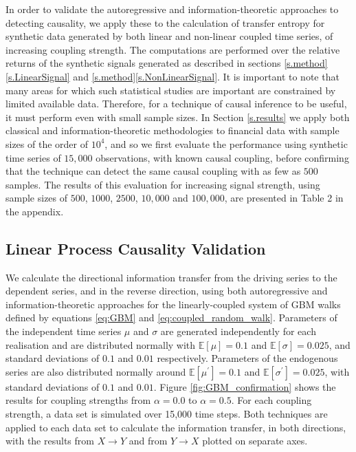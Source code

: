 \documentclass[]{rsos}%
\begin{document}
  In order to validate the autoregressive and information-theoretic approaches to detecting causality, we apply these to the calculation of transfer entropy for synthetic data generated by both linear and non-linear coupled time series, of increasing coupling strength. 
  The computations are performed over the relative returns of the synthetic signals generated as described in sections \ref{s.method}\ref{s.LinearSignal} and \ref{s.method}\ref{s.NonLinearSignal}. 
  It is important to note that many areas for which such statistical studies are important are constrained by limited available data. Therefore, for a technique of causal inference to be useful, it must perform even with small sample sizes. In Section \ref{s.results} we apply both classical and information-theoretic methodologies to financial data with sample sizes of the order of $10^4$, and so we first evaluate the performance using synthetic time series of $15,000$ observations, with known causal coupling, before confirming that the technique can detect the same causal coupling with as few as $500$ samples. The results of this evaluation for increasing signal strength, using sample sizes of $500$, $1000$, $2500$, $10,000$ and $100,000$, are presented in Table {\color{blue}2} in the appendix.


  \subsection{Linear Process Causality Validation} 

  We calculate the directional information transfer from the driving series to the dependent series, and in the reverse direction, using both autoregressive and information-theoretic approaches for the linearly-coupled system of GBM walks defined by equations \ref{eq:GBM} and \ref{eq:coupled_random_walk}. Parameters of the independent time series $\mu$ and $\sigma $ are generated independently for each realisation and are distributed normally with $\mathbb{E} [\mu]=0.1$ and $\mathbb{E} [\sigma]=0.025$, and standard deviations of $0.1$ and $0.01$ respectively. Parameters of the endogenous series are also distributed normally around $\mathbb{E} [\mu^{\prime}]=0.1$ and $\mathbb{E} [\sigma^{\prime}]=0.025$, with standard deviations of $0.1$ and $0.01$. Figure \ref{fig:GBM_confirmation} shows the results for coupling strengths from $\alpha = 0.0$ to $\alpha = 0.5$. For each coupling strength, a data set is simulated over 15,000 time steps. Both techniques are applied to each data set to calculate the information transfer, in both directions, with the results from $X \rightarrow Y$ and from $Y \rightarrow X$ plotted on separate axes. 
\end{document}
